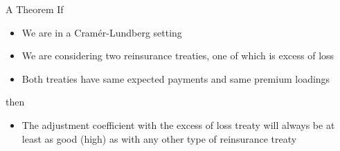 \documentclass[11pt]{beamer}
\begin{document}
\begin{frame}{A Theorem}
If
\begin{itemize}
\item We are in a Cram\'er-Lundberg setting
\item We are considering two reinsurance treaties, one of which is excess of loss
\item Both treaties have same expected payments and same premium loadings
\end{itemize}
then
\begin{itemize}
\item The adjustment coefficient with the excess of loss treaty will always be \alert{at least as good (high) as with any other type of reinsurance treaty}
\end{itemize}

\end{frame}
\end{document}

